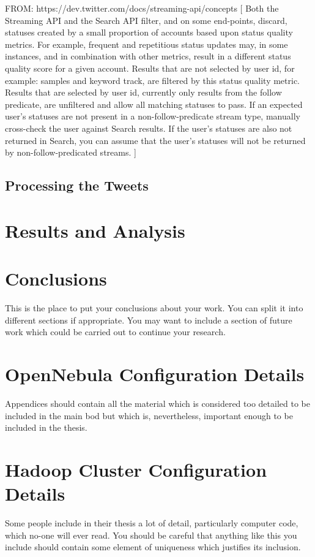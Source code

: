 \documentclass[12pt,a4paper]{report}
\begin{document}
FROM: https://dev.twitter.com/docs/streaming-api/concepts
[
Both the Streaming API and the Search API filter, and on some end-points,
discard, statuses created by a small proportion of accounts based upon status
quality metrics. For example, frequent and repetitious status updates may,
in some instances, and in combination with other metrics, result in a
different status quality score for a given account. Results that are not selected
by user id, for example: samples and keyword track, are filtered by this
status quality metric. Results that are selected by user id, currently only
results from the follow predicate, are unfiltered and allow all
matching statuses to pass. If an expected user's statuses are not present in a
non-follow-predicate stream type, manually cross-check the user against Search
results. If the user's statuses are also not returned in Search, you can assume
that the user's statuses will not be returned by non-follow-predicated streams.
]

\section{Processing the Tweets}

\chapter{Results and Analysis}


\chapter{Conclusions}

This is the place to put your conclusions about your work. You can
split it into different sections if appropriate. You may want to include
a section of future work which could be carried out to continue your
research.

\appendix

\chapter{OpenNebula Configuration Details}

Appendices should contain all the material which is considered too
detailed to be included in the main bod but which is, nevertheless,
important enough to be included in the thesis.

\chapter{Hadoop Cluster Configuration Details}

Some  people include in their \cite{fox2009above}thesis a lot of detail, particularly
computer code, which no-one will ever read. You should be careful that
anything like this you include \cite{website:aws} should contain some element
 of \cite{weinman2011future}uniqueness which justifies its inclusion.



\end{document}
